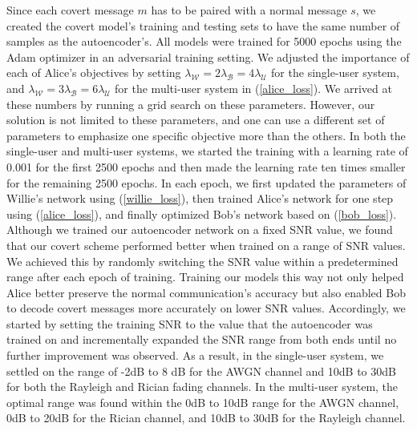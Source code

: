 Since each covert message \(m\) has to be paired with a normal message \(s\), we created the covert model's training and testing sets to have the same number of samples as the autoencoder's. All models were trained for 5000 epochs using the Adam optimizer in an adversarial training setting. We adjusted the importance of each of Alice's objectives by setting \(\lambda_{\mathcal{W}} = 2 \lambda_{\mathcal{B}} = 4 \lambda_{\mathcal{U}}\) for the single-user system, and \(\lambda_{\mathcal{W}} = 3 \lambda_{\mathcal{B}} = 6 \lambda_{\mathcal{U}}\) for the multi-user system in (\ref{alice_loss}). We arrived at these numbers by running a grid search on these parameters. However, our solution is not limited to these parameters, and one can use a different set of parameters to emphasize one specific objective more than the others. In both the single-user and multi-user systems, we started the training with a learning rate of 0.001 for the first 2500 epochs and then made the learning rate ten times smaller for the remaining 2500 epochs. In each epoch, we first updated the parameters of Willie's network using (\ref{willie_loss}), then trained Alice's network for one step using (\ref{alice_loss}), and finally optimized Bob's network based on (\ref{bob_loss}). Although we trained our autoencoder network on a fixed SNR value, we found that our covert scheme performed better when trained on a range of SNR values. We achieved this by randomly switching the SNR value within a predetermined range after each epoch of training. Training our models this way not only helped Alice better preserve the normal communication's accuracy but also enabled Bob to decode covert messages more accurately on lower SNR values. Accordingly, we started by setting the training SNR to the value that the autoencoder was trained on and incrementally expanded the SNR range from both ends until no further improvement was observed. As a result, in the single-user system, we settled on the range of -2dB to 8 dB for the AWGN channel and 10dB to 30dB for both the Rayleigh and Rician fading channels. In the multi-user system, the optimal range was found within the 0dB to 10dB range for the AWGN channel, 0dB to 20dB for the Rician channel, and 10dB to 30dB for the Rayleigh channel.

